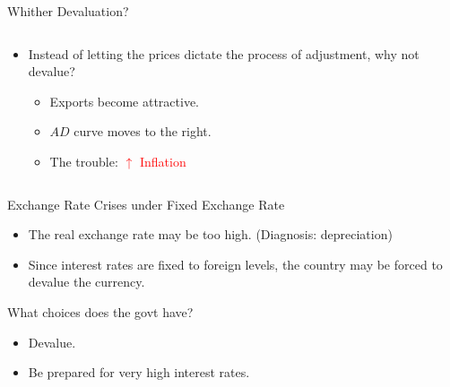 \documentclass[shownotes,11pt, aspectratio=169]{beamer}
\begin{document}
\begin{frame}{Whither Devaluation?}
\begin{columns}[T] %
\begin{column}{.4\textwidth}
\begin{itemize}
\item Instead of letting the prices dictate the process of adjustment, why not devalue?
     \begin{itemize}
     \item Exports become attractive.
     \item $AD$ curve moves to the right. 
     \pause
     \item The trouble: \textcolor{red}{$\uparrow$ Inflation}
     \end{itemize}
\end{itemize}
\end{column}
\hfill
\pause
\begin{column}{.54\textwidth}
\end{column}
\end{columns}
\end{frame}


\begin{frame}{Exchange Rate Crises under Fixed Exchange Rate}
\begin{itemize}
\item The real exchange rate may be too high. (Diagnosis: depreciation)
\item Since interest rates are fixed to foreign levels, the country may be forced to devalue the currency.
\end{itemize}
What choices does the govt have?
\begin{itemize}
\item Devalue.
\item Be prepared for very high interest rates.
\end{itemize}
\end{frame}
\end{document}
